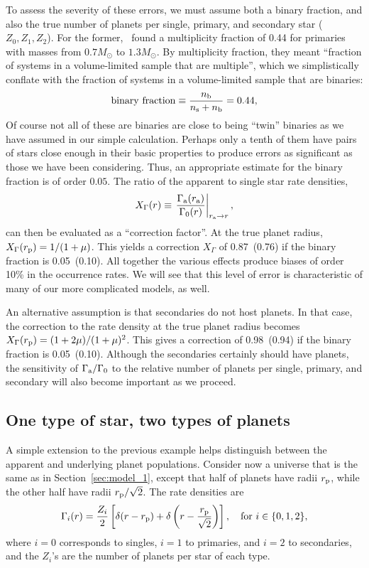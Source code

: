 \documentclass[12pt,modern]{aastex61}
\renewcommand{\a}{_{\rm a}}
\newcommand{\s}{_{\rm s}}
\newcommand{\p}{_{\rm p}}
\renewcommand{\b}{_{\rm b}}
\begin{document}
To assess the severity of these errors, we must assume both a binary
fraction, and also the true number of planets per single, primary, and
secondary star ($Z_0,Z_1,Z_2$).  For the
former,~\citet{raghavan_survey_2010} found a multiplicity fraction of
0.44 for primaries with masses from $0.7M_\odot$ to $1.3M_\odot$.  By
multiplicity fraction, they meant ``fraction of systems in a
volume-limited sample that are multiple'', which we simplistically
conflate with the fraction of systems in a volume-limited sample that
are binaries:
\begin{equation}
    {\rm binary\ fraction} \equiv \frac{n\b}{n\s + n\b} = 0.44,
\end{equation}
Of course not all of these are binaries are close to being ``twin''
binaries as we have assumed in our simple calculation.  Perhaps only a
tenth of them have pairs of stars close enough in their basic
properties to produce errors as significant as those we have been
considering.  Thus, an appropriate estimate for the binary fraction is
of order $0.05$.  The ratio of the apparent to single star rate
densities,
\begin{equation}
    X_\Gamma(r) \equiv \left. \frac{\Gamma\a(r\a)}{\Gamma_0(r)}
      \right|_{r\a \rightarrow r},
\end{equation}
can then be evaluated as a ``correction factor''.  At the true planet
radius, $X_\Gamma(r\p)=1/(1+\mu)$.  This yields a correction
$X_\Gamma$ of 0.87~(0.76) if the binary fraction is 0.05~(0.10).  All
together the various effects produce biases of order 10\% in the
occurrence rates.  We will see that this level of error is
characteristic of many of our more complicated models, as well.

An alternative assumption is that secondaries do not host planets. In
that case, the correction to the rate density at the true planet
radius becomes $X_\Gamma(r\p) = (1+2\mu)/(1+\mu)^2$.  This gives a
correction of 0.98~(0.94) if the binary fraction is 0.05~(0.10).
Although the secondaries certainly should have planets, the
sensitivity of $\Gamma\a/\Gamma_0$ to the relative number of planets
per single, primary, and secondary will also become important as we
proceed.

\subsection{One type of star, two types of planets}

A simple extension to the previous example helps distinguish between
the apparent and underlying planet populations.  Consider now a
universe that is the same as in Section~\ref{sec:model_1}, except that
half of planets have radii $r\p$, while the other half have radii
$r\p/\sqrt{2}$.  The rate densities are
\begin{equation}
    \Gamma_i(r) = \frac{Z_i}{2} \left[
    \delta(r-r\p) + \delta\left(r-\frac{r\p}{\sqrt{2}}\right)
    \right], \quad {\rm for}\  i \in \{ 0,1,2 \},
\end{equation}
where $i=0$ corresponds to singles, $i=1$ to primaries, and $i=2$ to
secondaries, and the $Z_i$'s are the number of planets per star of
each type.
\end{document}
